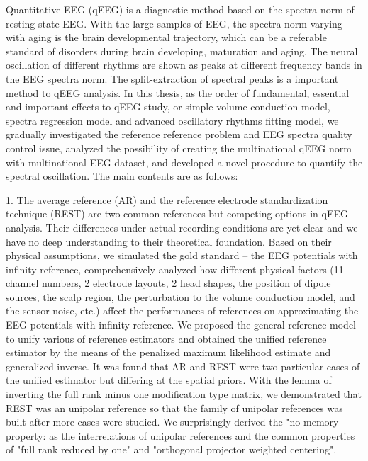 
\begin{englishabstract}
Quantitative EEG (qEEG) is a diagnostic method based on the spectra norm of resting state EEG. With the large samples of EEG, the spectra norm varying with aging is the brain developmental trajectory, which can be a referable standard of disorders during brain developing, maturation and aging. The neural oscillation of different rhythms are shown as peaks at different frequency bands in the EEG spectra norm. The split-extraction of spectral peaks is a important method to qEEG analysis. In this thesis, as the order of fundamental, essential and important effects to qEEG study, or simple volume conduction model, spectra regression model and advanced oscillatory rhythms fitting model, we gradually investigated the reference reference problem and EEG spectra quality control issue, analyzed the possibility of creating the multinational qEEG norm with multinational EEG dataset, and developed a novel procedure to quantify the spectral oscillation. The main contents are as follows:

1. The average reference (AR) and the reference electrode standardization technique (REST) are two common references but competing options in qEEG analysis. Their differences under actual recording conditions are yet clear and we have no deep understanding to their theoretical foundation. Based on their physical assumptions, we simulated the gold standard -- the EEG potentials with infinity reference, comprehensively analyzed how different physical factors (11 channel numbers, 2 electrode layouts, 2 head shapes, the position of dipole sources, the scalp region, the perturbation to the volume conduction model, and the sensor noise, etc.) affect the performances of references on approximating the EEG potentials with infinity reference. We proposed the general reference model to unify various of reference estimators and obtained the unified reference estimator by the means of the penalized maximum likelihood estimate and generalized inverse. It was found that AR and REST were two particular cases of the unified estimator but differing at the spatial priors. With the lemma of inverting the full rank minus one modification type matrix, we demonstrated that REST was an unipolar reference so that the family of unipolar references was built after more cases were studied. We surprisingly derived the "no memory property: as the interrelations of unipolar references and the common properties of "full rank reduced by one" and "orthogonal projector weighted centering".


\end{englishabstract}
